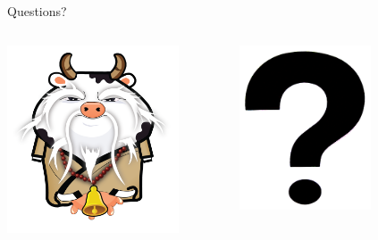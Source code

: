 \documentclass[aspectratio=169]{beamer}
\begin{document}
\begin{frame}{Questions?}
    \begin{columns}
        \begin{column}[c]{0.5\textwidth}
            \includegraphics[width=0.8\textwidth]{images/holycow.png}
        \end{column}
        \begin{column}[c]{0.5\textwidth}
            \includegraphics[width=0.6\textwidth]{images/questions.png}
        \end{column}
    \end{columns}
\end{frame}
\end{document}
